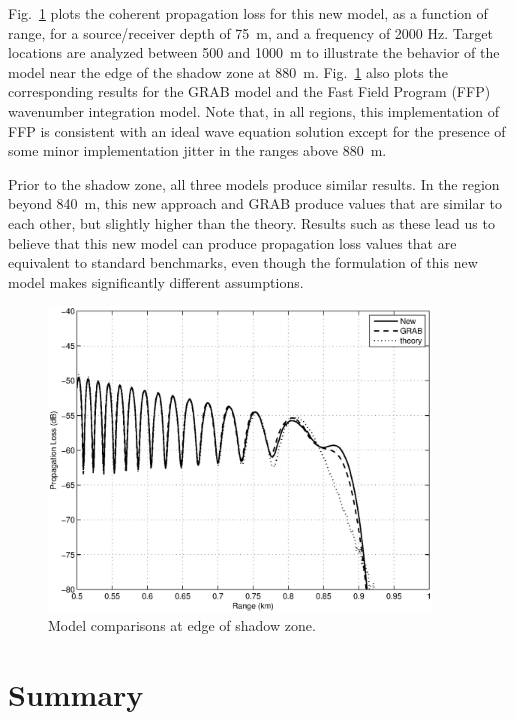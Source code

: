 \documentclass{ws-jca}
\begin{document}
Fig.~\ref{fig:n2_shallow} plots the coherent propagation loss for this new
model, as a function of range, for a source/receiver depth of 75~m, and
a frequency of 2000 Hz. Target locations are analyzed between 500 and 1000~m
to illustrate the behavior of the model near the edge of the shadow zone at 880~m.
Fig.~\ref{fig:n2_shallow} also plots the corresponding results for the
GRAB model and the Fast Field Program (FFP) wavenumber integration
model.\cite{DiNapoli1980,Brekhovskikh1980} Note that, in all regions, this
implementation of FFP is consistent with an ideal wave equation solution except
for the presence of some minor implementation jitter in the ranges above 880~m.

Prior to the shadow zone, all three models produce similar results. In the
region beyond 840~m, this new approach and GRAB produce values that are
similar to each other, but slightly higher than the theory. Results such as
these lead us to believe that this new model can produce propagation loss
values that are equivalent to standard benchmarks, even though the
formulation of this new model makes significantly different assumptions.

\begin{figure}[th]
	\centerline{\includegraphics[width=4in]{pedersen_shallow_compare.eps}} 
	\vspace*{8pt}
	\caption{Model comparisons at edge of shadow zone. \label{fig:n2_shallow}}
\end{figure}

\section{Summary}
\end{document}

